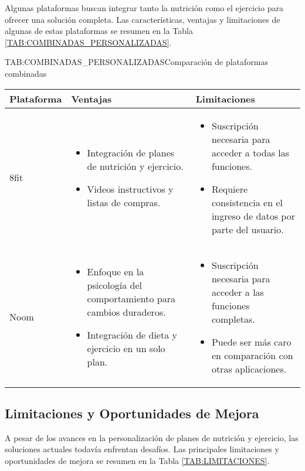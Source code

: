 Algunas plataformas buscan integrar tanto la nutrición como el ejercicio para ofrecer una solución completa. Las características, ventajas y limitaciones de algunas de estas plataformas se resumen en la Tabla \ref{TAB:COMBINADAS_PERSONALIZADAS}.

\begin{table}[Plataformas Combinadas]{TAB:COMBINADAS_PERSONALIZADAS}{Comparación de plataformas combinadas}
  \begin{tabular}{|p{3cm}|p{5cm}|p{5cm}|}
    \hline
    \textbf{Plataforma} & \textbf{Ventajas} & \textbf{Limitaciones} \\
    \hline
    8fit & \begin{itemize}
      \item Integración de planes de nutrición y ejercicio.
      \item Videos instructivos y listas de compras.
    \end{itemize} & \begin{itemize}
      \item Suscripción necesaria para acceder a todas las funciones.
      \item Requiere consistencia en el ingreso de datos por parte del usuario.
    \end{itemize} \\
    \hline
    Noom & \begin{itemize}
      \item Enfoque en la psicología del comportamiento para cambios duraderos.
      \item Integración de dieta y ejercicio en un solo plan.
    \end{itemize} & \begin{itemize}
      \item Suscripción necesaria para acceder a las funciones completas.
      \item Puede ser más caro en comparación con otras aplicaciones.
    \end{itemize} \\
    \hline
  \end{tabular}
\end{table}

\subsection{Limitaciones y Oportunidades de Mejora}

A pesar de los avances en la personalización de planes de nutrición y ejercicio, las soluciones actuales todavía enfrentan desafíos. Las principales limitaciones y oportunidades de mejora se resumen en la Tabla \ref{TAB:LIMITACIONES}.

